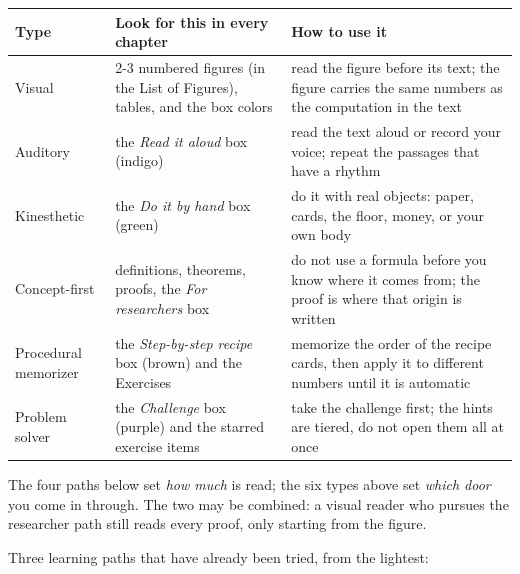 \begin{center}
\small
\begin{tabular}{@{}p{3.4cm}p{4.3cm}p{4.6cm}@{}}
\toprule
\textbf{Type} & \textbf{Look for this in every chapter} & \textbf{How to use it} \\
\midrule
Visual & 2-3 numbered figures (in the List of Figures), tables, and the box colors & read
  the figure before its text; the figure carries the same numbers as the computation in
  the text \\[2pt]
Auditory & the \emph{Read it aloud} box (indigo) & read the text aloud or record your
  voice; repeat the passages that have a rhythm \\[2pt]
Kinesthetic & the \emph{Do it by hand} box (green) & do it with real objects: paper,
  cards, the floor, money, or your own body \\[2pt]
Concept-first & definitions, theorems, proofs, the \emph{For researchers} box & do not
  use a formula before you know where it comes from; the proof is where that origin is
  written \\[2pt]
Procedural memorizer & the \emph{Step-by-step recipe} box (brown) and the Exercises &
  memorize the order of the recipe cards, then apply it to different numbers until it is
  automatic \\[2pt]
Problem solver & the \emph{Challenge} box (purple) and the starred exercise items & take
  the challenge first; the hints are tiered, do not open them all at once \\
\bottomrule
\end{tabular}
\end{center}

The four paths below set \emph{how much} is read; the six types above set \emph{which
door} you come in through. The two may be combined: a visual reader who pursues the
researcher path still reads every proof, only starting from the figure.

Three learning paths that have already been tried, from the lightest:

